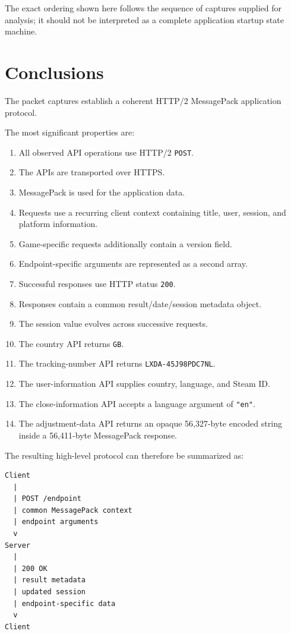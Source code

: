 \documentclass[11pt,a4paper]{article}
\begin{document}
The exact ordering shown here follows the sequence of captures supplied for
analysis; it should not be interpreted as a complete application startup
state machine.

\newpage

\section{Conclusions}

The packet captures establish a coherent HTTP/2 MessagePack application
protocol.

The most significant properties are:

\begin{enumerate}
    \item All observed API operations use HTTP/2 \texttt{POST}.
    \item The APIs are transported over HTTPS\@.
    \item MessagePack is used for the application data.
    \item Requests use a recurring client context containing title, user,
          session, and platform information.
    \item Game-specific requests additionally contain a version field.
    \item Endpoint-specific arguments are represented as a second array.
    \item Successful responses use HTTP status \texttt{200}.
    \item Responses contain a common result/date/session metadata object.
    \item The session value evolves across successive requests.
    \item The country API returns \texttt{GB}.
    \item The tracking-number API returns
          \texttt{LXDA-45J98PDC7NL}.
    \item The user-information API supplies country, language, and Steam ID\@.
    \item The close-information API accepts a language argument of
          \verb|"en"|.
    \item The adjustment-data API returns an opaque 56,327-byte encoded
          string inside a 56,411-byte MessagePack response.
\end{enumerate}

The resulting high-level protocol can therefore be summarized as:

\begin{lstlisting}
Client
  |
  | POST /endpoint
  | common MessagePack context
  | endpoint arguments
  v
Server
  |
  | 200 OK
  | result metadata
  | updated session
  | endpoint-specific data
  v
Client
\end{lstlisting}


\end{document}
